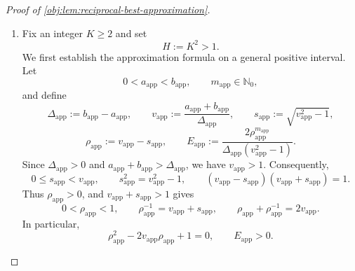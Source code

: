 \begin{proof}[Proof of \cref{obj:lem:reciprocal-best-approximation}]
\begin{enumerate}
\item Fix an integer \(K\ge 2\) and set
\[
H:=K^2>1.
\]
We first establish the approximation formula on a general positive interval. Let
\[
0<a_{\mathrm{app}}<b_{\mathrm{app}},
\qquad m_{\mathrm{app}}\in\mathbb N_0,
\]
and define
\[
\Delta_{\mathrm{app}}:=b_{\mathrm{app}}-a_{\mathrm{app}},
\qquad
v_{\mathrm{app}}:=\frac{a_{\mathrm{app}}+b_{\mathrm{app}}}
{\Delta_{\mathrm{app}}},
\qquad
s_{\mathrm{app}}:=\sqrt{v_{\mathrm{app}}^2-1},
\]
\[
\rho_{\mathrm{app}}:=v_{\mathrm{app}}-s_{\mathrm{app}},
\qquad
E_{\mathrm{app}}:=
\frac{2\rho_{\mathrm{app}}^{m_{\mathrm{app}}}}
{\Delta_{\mathrm{app}}(v_{\mathrm{app}}^2-1)}.
\]
Since \(\Delta_{\mathrm{app}}>0\) and
\(a_{\mathrm{app}}+b_{\mathrm{app}}>\Delta_{\mathrm{app}}\), we have
\(v_{\mathrm{app}}>1\). Consequently,
\[
0\le s_{\mathrm{app}}<v_{\mathrm{app}},
\qquad
s_{\mathrm{app}}^2=v_{\mathrm{app}}^2-1,
\qquad
(v_{\mathrm{app}}-s_{\mathrm{app}})
(v_{\mathrm{app}}+s_{\mathrm{app}})=1.
\]
Thus \(\rho_{\mathrm{app}}>0\), and
\(v_{\mathrm{app}}+s_{\mathrm{app}}>1\) gives
\[
0<\rho_{\mathrm{app}}<1,
\qquad
\rho_{\mathrm{app}}^{-1}=v_{\mathrm{app}}+s_{\mathrm{app}},
\qquad
\rho_{\mathrm{app}}+\rho_{\mathrm{app}}^{-1}=2v_{\mathrm{app}}.
\]
In particular,
\[
\rho_{\mathrm{app}}^2-2v_{\mathrm{app}}\rho_{\mathrm{app}}+1=0,
\qquad E_{\mathrm{app}}>0.
\]


\end{enumerate}
\end{proof}
